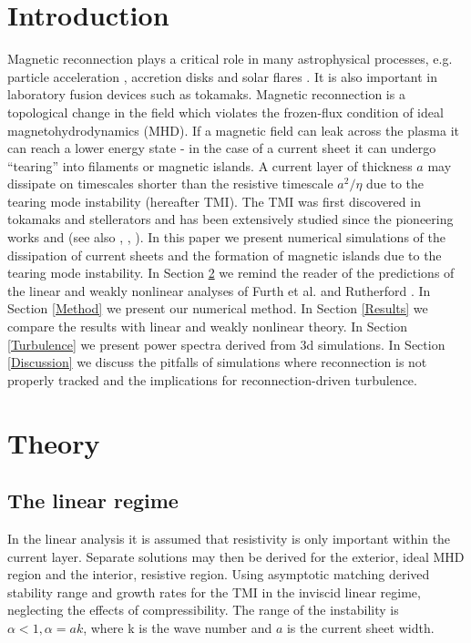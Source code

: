 \documentclass[square]{ws-procs11x85}
\begin{document}
\begin{multicols}{2}
\section{Introduction}
 Magnetic reconnection plays a critical role in many astrophysical processes, e.g. particle acceleration \cite{Phan}, accretion disks \cite{Hawley} and solar flares \cite{Shibata}. 
It is also important in laboratory fusion devices such as tokamaks.  
Magnetic reconnection is a topological change in the field which violates the frozen-flux condition of ideal magnetohydrodynamics (MHD). 
If a magnetic field can leak across the plasma it can reach a lower energy state - in the case of a current sheet it can undergo ``tearing'' into filaments or magnetic islands.  
A current layer of thickness $a$ may dissipate on timescales shorter than the resistive timescale $a^2/\eta$ due to the tearing mode instability (hereafter TMI).  
The TMI was first discovered in tokamaks and stellerators and has been extensively studied since the pioneering works \cite{Furth} and \cite{Rutherford} (see also \cite{White}, \cite{PriestForbes}, \cite{Biskamp}). In this paper we present numerical simulations of the dissipation of current sheets and the formation of magnetic islands due to the tearing mode instability.  In Section \ref{Analysis} we remind the reader of the predictions of the linear and weakly nonlinear analyses of Furth et al. \cite{Furth} and Rutherford \cite{Rutherford}.  In Section \ref{Method} we present our numerical method. In Section \ref{Results} we compare the results with linear and weakly nonlinear theory.  In Section \ref{Turbulence} we present power spectra derived from 3d simulations.  In Section \ref{Discussion} we discuss the pitfalls of simulations where reconnection is not properly tracked and the implications for reconnection-driven turbulence.

\section{Theory}
\label{Analysis}


\subsection{The linear regime}

In the linear analysis it is assumed that resistivity is only important within
the current layer.
Separate solutions may then be derived for the exterior, ideal MHD region and
the
interior, resistive region.
Using asymptotic matching \cite{Furth} derived stability range and
growth rates for the TMI in the
inviscid linear regime, neglecting the effects of compressibility.
The range of the instability is $\alpha < 1, \alpha=ak $, where k is the wave
number and $a$ is the current sheet width.


\end{multicols}
\end{document}
